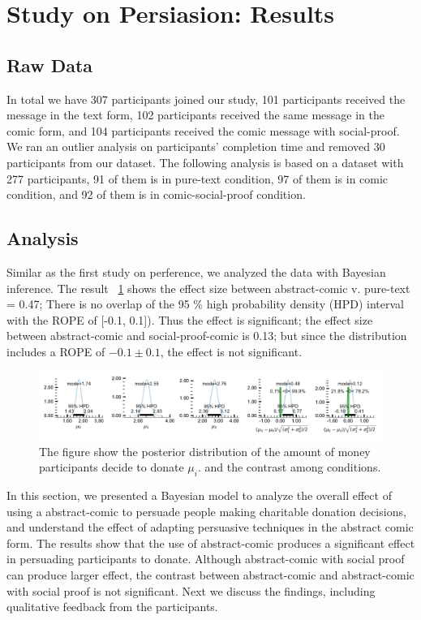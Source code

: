 \section{Study on Persiasion: Results}
\label{sec:Study on Behavior Results}

\subsection{Raw Data}
\label{sub:Study on Behavior Raw Data}
In total we have 307 participants joined our study, 101 participants received the message in the text form, 102 participants received the same message in the comic form, and 104 participants received the comic message with social-proof. We ran an outlier analysis on participants' completion time and removed 30 participants from our dataset. The following analysis is based on a dataset with 277 participants, 91 of them is in pure-text condition, 97 of them is in comic condition, and 92 of them is in comic-social-proof condition.

\subsection{Analysis}
\label{sub:Study on Behavior Analysis}

Similar as the first study on perference, we analyzed the data with Bayesian inference. The result ~\ref{fig:main-experiment2-effect} shows the effect size between abstract-comic v. pure-text = 0.47; There is no overlap of the 95 \% high probability density (HPD) interval with the ROPE of [-0.1, 0.1]). Thus the effect is significant; the effect size between abstract-comic and social-proof-comic is 0.13; but since the distribution includes a ROPE of $-0.1 \pm 0.1$, the effect is not significant.

\begin{figure}
 \includegraphics[width=1\textwidth]{./hari-code/new_exp_text_v_comic_v_social.pdf}
 \caption{The figure show the posterior distribution of the amount of money participants decide to donate $\mu_i$. and the contrast among conditions.}
 \label{fig:main-experiment2-effect}
\end{figure}

In this section, we presented a Bayesian model to analyze the overall effect of using a abstract-comic to persuade people making charitable donation decisions, and understand the effect of adapting persuasive techniques in the abstract comic form. The results show that the use of abstract-comic produces a significant effect in persuading participants to donate. Although abstract-comic with social proof can produce larger effect, the contrast between abstract-comic and abstract-comic with social proof is not significant. Next we discuss the findings, including qualitative feedback from the participants.
